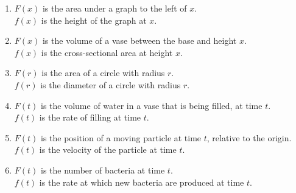 \documentclass[12pt]{article}
\begin{document}
\begin{enumerate}
\item $F(x)$ is the area under a graph to the left of $x$.\\
      $f(x)$ is the height of the graph at $x$.\\

\item $F(x)$ is the volume of a vase between the base and height $x$. \\
      $f(x)$ is the cross-sectional area at height $x$.\\

\item $F(r)$ is the area of a circle with radius $r$.\\
      $f(r)$ is the diameter of a circle with radius $r$.\\

\item $F(t)$ is the volume of water in a vase that is being filled, at time $t$.\\
      $f(t)$ is the rate of filling at time $t$.\\

\item $F(t)$ is the position of a moving particle at time $t$, relative to the origin.\\
      $f(t)$ is the velocity of the particle at time $t$.\\

\item $F(t)$ is the number of bacteria at time $t$.\\
      $f(t)$ is the rate at which new bacteria are produced at time $t$.
\end{enumerate}
\end{document}
